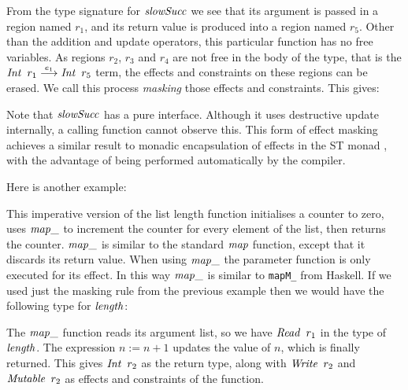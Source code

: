 From the type signature for $\operatorname{\mathit{slowSucc}}$ we see that its argument is passed in a region named $r_1$, and its return value is produced into a region named $r_5$. Other than the addition and update operators, this particular function has no free variables. As regions $r_2$, $r_3$ and $r_4$ are not free in the body of the type, that is the $\operatorname{\mathit{Int}} \ r_1 \stackrel{e_1}{\longrightarrow} \operatorname{\mathit{Int}} \ r_5$ term, the effects and constraints on these regions can be erased. We call this process \emph{masking} those effects and constraints. This gives:


Note that $\operatorname{\mathit{slowSucc}}$ has a pure interface. Although it uses destructive update internally, a calling function cannot observe this. This form of effect masking achieves a similar result to monadic encapsulation of effects in the ST monad \cite{launchbury:lazy-functional-state-threads}, with the advantage of being performed automatically by the compiler.

Here is another example:


This imperative version of the list length function initialises a counter to zero, uses $\operatorname{\mathit{map\_}}$ to increment the counter for every element of the list, then returns the counter. $\operatorname{\mathit{map\_}}$ is similar to the standard $\operatorname{\mathit{map}}$ function, except that it discards its return value. When using $\operatorname{\mathit{map\_}}$ the parameter function is only executed for its effect. In this way $\operatorname{\mathit{map\_}}$ is similar to \texttt{mapM\_} from Haskell. If we used just the masking rule from the previous example then we would have the following type for $\operatorname{\mathit{length}}$:


The $\operatorname{\mathit{map\_}}$ function reads its argument list, so we have $\iRead \ r_1$ in the type of $\operatorname{\mathit{length}}$. The expression $n := n + 1$ updates the value of $n$, which is finally returned. This gives $\iInt \ r_2$ as the return type, along with $\operatorname{\mathit{Write}} \ r_2$ and $\operatorname{\mathit{Mutable}} \ r_2$ as effects and constraints of the function.

